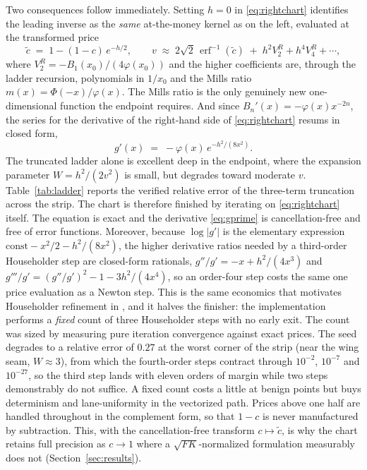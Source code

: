 \documentclass[11pt]{article}
\newcommand{\erf}{\operatorname{erf}}
\newcommand{\PhiN}{\Phi}
\begin{document}
Two consequences follow immediately. Setting $h=0$ in \eqref{eq:rightchart} identifies the leading inverse as the \emph{same} at-the-money kernel as on the left, evaluated at the transformed price
\begin{equation}
  \tilde c \;=\; 1-(1-c)\,e^{-h/2},
  \qquad
  v \;\approx\; 2\sqrt2\,\erf^{-1}(\tilde c)\;+\;h^2V_2^{R}+h^4V_4^{R}+\cdots,
\end{equation}
where $V_2^{R}=-B_1(x_0)/(4\varphi(x_0))$ and the higher coefficients are, through the ladder recursion, polynomials in $1/x_0$ and the Mills ratio $m(x)=\PhiN(-x)/\varphi(x)$. The Mills ratio is the only genuinely new one-dimensional function the endpoint requires. And since $B_n'(x)=-\varphi(x)x^{-2n}$, the series for the derivative of the right-hand side of \eqref{eq:rightchart} resums in closed form,
\begin{equation}
  g'(x) \;=\; -\varphi(x)\,e^{-h^2/(8x^2)} .
  \label{eq:gprime}
\end{equation}
The truncated ladder alone is excellent deep in the endpoint, where the expansion parameter $W=h^2/(2v^2)$ is small, but degrades toward moderate $v$. Table~\ref{tab:ladder} reports the verified relative error of the three-term truncation across the strip. The chart is therefore finished by iterating on \eqref{eq:rightchart} itself. The equation is exact and the derivative \eqref{eq:gprime} is cancellation-free and free of error functions. Moreover, because $\log|g'|$ is the elementary expression $\mathrm{const}-x^2/2-h^2/(8x^2)$, the higher derivative ratios needed by a third-order Householder step are closed-form rationals, $g''/g'=-x+h^2/(4x^3)$ and $g'''/g'=(g''/g')^2-1-3h^2/(4x^4)$, so an order-four step costs the same one price evaluation as a Newton step. This is the same economics that motivates Householder refinement in \citet{jackel2015rational}, and it halves the finisher: the implementation performs a \emph{fixed} count of three Householder steps with no early exit. The count was sized by measuring pure iteration convergence against exact prices. The seed degrades to a relative error of $0.27$ at the worst corner of the strip (near the wing seam, $W\approx3$), from which the fourth-order steps contract through $10^{-2}$, $10^{-7}$ and $10^{-27}$, so the third step lands with eleven orders of margin while two steps demonstrably do not suffice. A fixed count costs a little at benign points but buys determinism and lane-uniformity in the vectorized path. Prices above one half are handled throughout in the complement form, so that $1-c$ is never manufactured by subtraction. This, with the cancellation-free transform $c\mapsto\tilde c$, is why the chart retains full precision as $c\to1$ where a $\sqrt{FK}$-normalized formulation measurably does not (Section~\ref{sec:results}).
\end{document}
